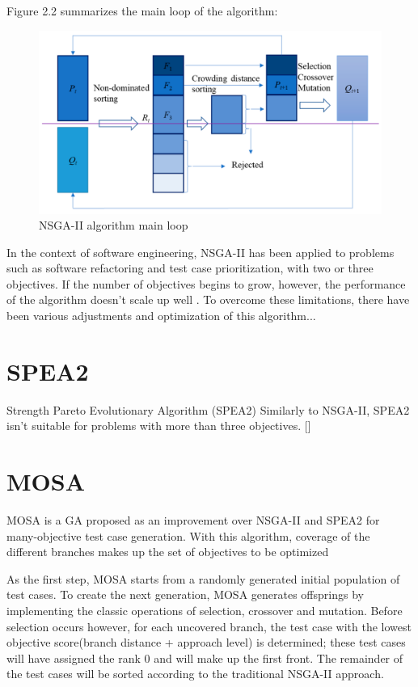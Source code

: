 Figure 2.2 summarizes the main loop of the algorithm:
\begin{figure}[!h]
    \centering
    \includegraphics[scale=0.1]{./figures/nsga-ii.png}
    \caption{NSGA-II algorithm main loop}
    \label{fig:NSGA-II algorithm main loop}
\end{figure}


In the context of software engineering, NSGA-II has been applied to problems such as software refactoring and test case prioritization,
with two or three objectives. If the number of objectives begins to grow, however, the performance of the algorithm doesn't scale up well \cite{DBLP:journals/csur/LiLTY15}.
To overcome these limitations, there have been various adjustments and optimization of this algorithm...








\section{SPEA2}
Strength Pareto Evolutionary Algorithm (SPEA2)
Similarly to NSGA-II, SPEA2 isn't suitable for problems with more than three objectives. []





\section{MOSA}
MOSA \cite{DBLP:conf/icst/PanichellaKT15} is a GA proposed as an improvement over NSGA-II and SPEA2 for many-objective test case generation. With this algorithm, coverage of the different branches makes up the set of objectives to be optimized

As the first step, MOSA starts from a randomly generated initial population of test cases. 
To create the next generation, MOSA generates offsprings by implementing the classic operations of selection, crossover and mutation. 
Before selection occurs however, for each uncovered branch, the test case with the lowest objective score(branch distance + approach level) is determined; these test cases will have assigned the rank 0 and will make up the first front. The remainder of the test cases will be sorted according to the traditional NSGA-II approach.

